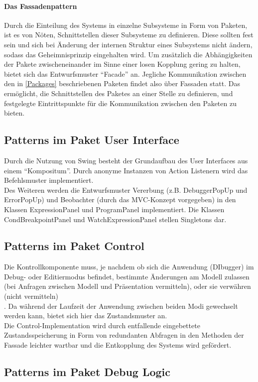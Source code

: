 \documentclass[parskip=full]{scrartcl}
\begin{document}
\paragraph{Das Fassadenpattern}
Durch die Einteilung des Systems in einzelne Subsysteme in Form von Paketen, ist es von Nöten, Schnittstellen dieser Subsysteme zu definieren. Diese sollten fest sein und sich bei Änderung der internen Struktur eines Subsystems nicht ändern, sodass das Geheimnisprinzip eingehalten wird. Um zusätzlich die Abhängigkeiten der Pakete zwischeneinander im Sinne einer losen Kopplung gering zu halten, bietet sich das Entwurfsmuster \enquote{Facade} an. Jegliche Kommunikation zwischen den in \ref{Packages} beschriebenen Paketen findet also über Fassaden statt. Das ermöglicht, die Schnittstellen des Paketes an einer Stelle zu definieren, und festgelegte Eintrittspunkte für die Kommunikation zwischen den Paketen zu bieten.
\subsection{Patterns im Paket User Interface}
Durch die Nutzung von Swing besteht der Grundaufbau des User Interfaces aus einem \enquote{Kompositum}. 
Durch anonyme Instanzen von Action Listenern wird das Befehlsmuster implementiert. \\
Des Weiteren werden die Entwurfsmuster Vererbung (z.B. DebuggerPopUp und ErrorPopUp) und Beobachter (durch das MVC-Konzept vorgegeben) in den Klassen ExpressionPanel und ProgramPanel implementiert.
Die Klassen CondBreakpointPanel und WatchExpressionPanel stellen Singletons dar. %
\subsection{Patterns im Paket Control}
Die Kontrollkomponente muss, je nachdem ob sich die Anwendung (DIbugger) im Debug- 
oder Editiermodus befindet, bestimmte Änderungen am Modell zulassen (bei Anfragen
zwischen Modell und Präsentation vermitteln), oder sie verwähren (nicht vermitteln)\\.
Da während der Laufzeit der Anwendung zwischen beiden Modi gewechselt werden kann,
bietet sich hier das Zustandsmuster an.\\
Die Control-Implementation wird durch entfallende eingebettete Zustandsspeicherung
in Form von redundanten Abfragen in den Methoden der Fassade leichter wartbar und
die Entkopplung des Systems wird gefördert. 
\subsection{Patterns im Paket Debug Logic}
\end{document}
